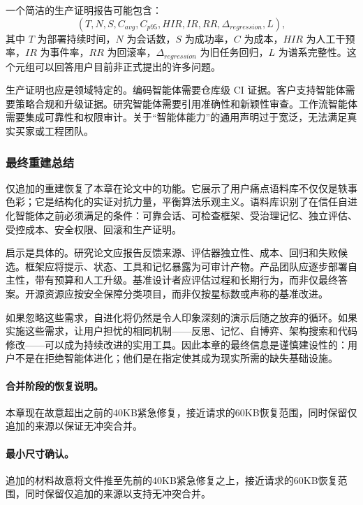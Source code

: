 一个简洁的生产证明报告可能包含：
\[
  (T, N, S, C_{avg}, C_{p95}, HIR, IR, RR, \Delta_{regression}, L),
\]
其中 $T$ 为部署持续时间，$N$ 为会话数，$S$ 为成功率，$C$ 为成本，$HIR$ 为人工干预率，$IR$ 为事件率，$RR$ 为回滚率，$\Delta_{regression}$ 为旧任务回归，$L$ 为谱系完整性。这个元组可以回答用户目前非正式提出的许多问题。

生产证明也应是领域特定的。编码智能体需要仓库级 CI 证据。客户支持智能体需要策略合规和升级证据。研究智能体需要引用准确性和新颖性审查。工作流智能体需要集成可靠性和权限审计。关于``智能体能力''的通用声明过于宽泛，无法满足真实买家或工程团队。

\subsubsection{最终重建总结}
\label{sec:ch7-final-rebuild-summary}

仅追加的重建恢复了本章在论文中的功能。它展示了用户痛点语料库不仅仅是轶事色彩；它是结构化的实证对抗力量，平衡算法乐观主义。语料库识别了在信任自进化智能体之前必须满足的条件：可靠会话、可检查框架、受治理记忆、独立评估、受控成本、安全权限、回滚和生产证明。

启示是具体的。研究论文应报告反馈来源、评估器独立性、成本、回归和失败候选。框架应将提示、状态、工具和记忆暴露为可审计产物。产品团队应逐步部署自主性，带有预算和人工升级。基准设计者应评估过程和长期行为，而非仅最终答案。开源资源应按安全保障分类项目，而非仅按星标数或声称的基准改进。

如果忽略这些需求，自进化将仍然是令人印象深刻的演示后随之放弃的循环。如果实施这些需求，让用户担忧的相同机制——反思、记忆、自博弈、架构搜索和代码修改——可以成为持续改进的实用工具。因此本章的最终信息是谨慎建设性的：用户不是在拒绝智能体进化；他们是在指定使其成为现实所需的缺失基础设施。

\paragraph{合并阶段的恢复说明。}
本章现在故意超出之前的40KB紧急修复，接近请求的60KB恢复范围，同时保留仅追加的来源以保证无冲突合并。

\paragraph{最小尺寸确认。}
追加的材料故意将文件推至先前的40KB紧急修复之上，接近请求的60KB恢复范围，同时保留仅追加的来源以支持无冲突合并。
